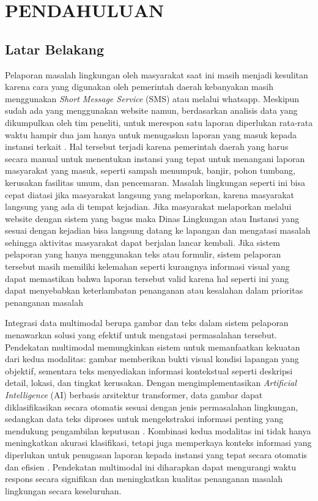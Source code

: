 \chapter{PENDAHULUAN}

\section{Latar Belakang}
Pelaporan masalah lingkungan oleh masyarakat saat ini masih menjadi kesulitan karena cara yang digunakan oleh pemerintah daerah kebanyakan masih menggunakan \textit{Short Message Service} (SMS) atau melalui whatsapp. Meskipun sudah ada yang menggunakan website namun, berdasarkan analisis data yang dikumpulkan oleh tim peneliti, untuk merespon satu laporan diperlukan rata-rata waktu hampir dua jam hanya untuk menugaskan laporan yang masuk kepada instansi terkait . Hal tersebut terjadi karena pemerintah daerah yang harus secara manual untuk menentukan instansi yang tepat untuk menangani laporan masyarakat yang masuk, seperti sampah menumpuk, banjir, pohon tumbang, kerusakan fasilitas umum, dan pencemaran. Masalah lingkungan seperti ini bisa cepat diatasi jika masyarakat langsung yang melaporkan, karena masyarakat langsung yang ada di tempat kejadian. Jika masyarakat melaporkan melalui website dengan sistem yang bagus maka Dinas Lingkungan atau Instansi yang sesuai dengan kejadian bisa langsung datang ke lapangan dan mengatasi masalah sehingga aktivitas masyarakat dapat berjalan lancar kembali. Jika sistem pelaporan yang hanya menggunakan teks atau formulir, sistem pelaporan tersebut masih memiliki kelemahan seperti kurangnya informasi visual yang dapat memastikan bahwa laporan tersebut valid karena hal seperti ini yang dapat menyebabkan keterlambatan penanganan atau kesalahan dalam prioritas penanganan masalah\citep{siretPublicComplainingBlessing2022}  

Integrasi data multimodal berupa gambar dan teks dalam sistem pelaporan menawarkan solusi yang efektif untuk mengatasi permasalahan tersebut. Pendekatan multimodal memungkinkan sistem untuk memanfaatkan kekuatan dari kedua modalitas: gambar memberikan bukti visual kondisi lapangan yang objektif, sementara teks menyediakan informasi kontekstual seperti deskripsi detail, lokasi, dan tingkat kerusakan. 
Dengan mengimplementasikan \textit{Artificial Intelligence} (AI) berbasis arsitektur transformer, data gambar dapat diklasifikasikan secara otomatis sesuai dengan jenis permasalahan lingkungan, sedangkan data teks diproses untuk mengekstraksi informasi penting yang mendukung pengambilan keputusan \citep{baltrusaitisMultimodalMachineLearning2019}. Kombinasi kedua modalitas ini tidak hanya meningkatkan akurasi klasifikasi, tetapi juga memperkaya konteks informasi yang diperlukan untuk penugasan laporan kepada instansi yang tepat secara otomatis dan efisien \citep{oquabDINOv2LearningRobust2024}. Pendekatan multimodal ini diharapkan dapat mengurangi waktu respons secara signifikan dan meningkatkan kualitas penanganan masalah lingkungan secara keseluruhan. 

